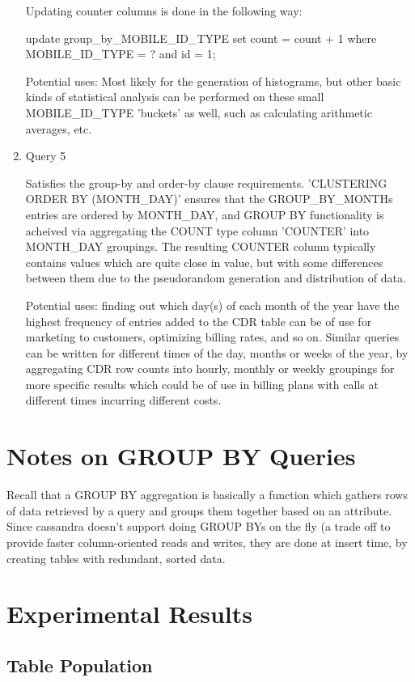 \documentclass[letterpaper]{article}
\begin{document}
\begin{enumerate}
		Updating counter columns is done in the following way:

		update group\_by\_MOBILE\_ID\_TYPE set count = count + 1  where MOBILE\_ID\_TYPE = ? and id = 1;

		Potential uses: Most likely for the generation of histograms, but other basic
		kinds of statistical analysis can be performed on these small MOBILE\_ID\_TYPE 
		'buckets' as well, such as calculating arithmetic averages, etc.

	\item Query 5
		

		Satisfies the group-by and order-by clause requirements. 
		'CLUSTERING ORDER BY (MONTH\_DAY)' ensures that the GROUP\_BY\_MONTHs entries are ordered
		by MONTH\_DAY, and GROUP BY functionality is acheived via aggregating the COUNT type
		column 'COUNTER' into MONTH\_DAY groupings. The resulting COUNTER column typically
		contains values which are quite close in value, but with some differences between
		them due to the pseudorandom generation and distribution of data.

		Potential uses: finding out which day(s) of each month of the year have the highest
		frequency of entries added to the CDR table can be of use for marketing to customers,
		optimizing billing rates, and so on. Similar queries can be written for different
		times of the day, months or weeks of the year, by aggregating CDR row counts into 
		hourly, monthly or weekly groupings for more specific results which could be of use 
		in billing plans with calls at different times incurring different costs.
\end{enumerate}

\section{Notes on GROUP BY Queries}
Recall that a GROUP BY aggregation is basically a function which
gathers rows of data retrieved by a query and groups them
together based on an attribute. Since cassandra doesn't support doing
GROUP BYs on the fly (a trade off to provide faster column-oriented reads and
writes, they are done at insert time, by creating tables with redundant,
sorted data.

\section{Experimental Results}

\subsection{Table Population}
\end{document}
